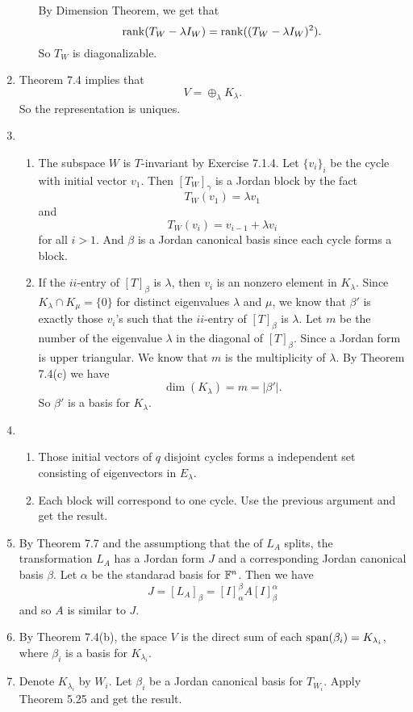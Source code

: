 \begin{enumerate}
\begin{enumerate}
By Dimension Theorem, we get that 
\[\rank(T_W-\lambda I_W)=\rank((T_W-\lambda I_W)^2).\]
So $T_W$ is diagonalizable.
\end{enumerate}
\item Theorem 7.4 implies that 
\[V=\oplus_{\lambda}K_{\lambda}.\]
So the representation is uniques.
\item \begin{enumerate}
\item The subspace $W$ is $T$-invariant by Exercise 7.1.4. Let $\{v_i\}_i$ be the cycle with initial vector $v_1$. Then $[T_W]_{\gamma}$ is a Jordan block by the fact 
\[T_W(v_1)=\lambda v_1\]
and 
\[T_W(v_i)=v_{i-1}+\lambda v_i\]
for all $i>1$. And $\beta $ is a Jordan canonical basis since each cycle forms a block.
\item If the $ii$-entry of $[T]_{\beta}$ is $\lambda$, then $v_i$ is an nonzero element in $K_{\lambda}$. Since $K_{\lambda}\cap K_{\mu}=\{0\}$ for distinct eigenvalues $\lambda $ and $\mu$, we know that $\beta'$ is exactly those $v_i$'s such that the $ii$-entry of $[T]_{\beta}$ is $\lambda$. Let $m$ be the number of the eigenvalue $\lambda$ in the diagonal of $[T]_{\beta}$. Since a Jordan form is upper triangular. We know that $m$ is the multiplicity of $\lambda$. By Theorem 7.4(c) we have 
\[\dim(K_{\lambda})=m=|\beta'|.\]
So $\beta'$ is a basis for $K_{\lambda}$.
\end{enumerate}
\item \begin{enumerate}
\item Those initial vectors of $q$ disjoint cycles forms a independent set consisting of eigenvectors in $E_{\lambda}$.
\item Each block will correspond to one cycle. Use the previous argument and get the result.
\end{enumerate}
\item By Theorem 7.7 and the assumptiong that the \charpoly{} of $L_A$ splits, the transformation $L_A$ has a Jordan form $J$ and a corresponding Jordan canonical basis $\beta$. Let $\alpha$ be the standarad basis for $\F^n$. Then we have 
\[J=[L_A]_{\beta}=[I]_{\alpha}^{\beta}A[I]_{\beta}^{\alpha}\]
and so $A$ is similar to $J$.
\item By Theorem 7.4(b), the space $V$ is the direct sum of each $\sp(\beta_i)=K_{\lambda_i}$, where $\beta_i$ is a basis for $K_{\lambda_i}$.
\item Denote $K_{\lambda_i}$ by $W_i$. Let $\beta_i$ be a Jordan canonical basis for $T_{W_i}$. Apply Theorem 5.25 and get the result.
\end{enumerate}